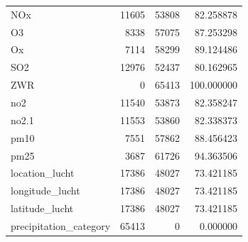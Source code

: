 \begin{tabular}{lrrr}
NOx & 11605 & 53808 & 82.258878 \\
O3 & 8338 & 57075 & 87.253298 \\
Ox & 7114 & 58299 & 89.124486 \\
SO2 & 12976 & 52437 & 80.162965 \\
ZWR & 0 & 65413 & 100.000000 \\
no2 & 11540 & 53873 & 82.358247 \\
no2.1 & 11553 & 53860 & 82.338373 \\
pm10 & 7551 & 57862 & 88.456423 \\
pm25 & 3687 & 61726 & 94.363506 \\
location_lucht & 17386 & 48027 & 73.421185 \\
longitude_lucht & 17386 & 48027 & 73.421185 \\
latitude_lucht & 17386 & 48027 & 73.421185 \\
precipitation_category & 65413 & 0 & 0.000000 \\
\bottomrule
\end{tabular}
